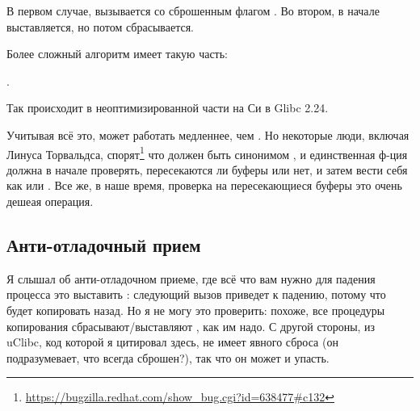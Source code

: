 В первом случае,  вызывается со сброшенным флагом .
Во втором,  в начале выставляется, но потом сбрасывается.

Более сложный алгоритм имеет такую часть:

.

Так происходит в неоптимизированной части на Си в Glibc 2.24.

Учитывая всё это,  может работать медленнее, чем .
Но некоторые люди, включая Линуса Торвальдса, спорят\footnote{\url{https://bugzilla.redhat.com/show_bug.cgi?id=638477\#c132}}
что  должен быть синонимом , и единственная ф-ция должна в начале проверять,
пересекаются ли буферы или нет, и затем вести себя как  или .
Все же, в наше время, проверка на пересекающиеся буферы это очень дешеая операция.

\subsection{Анти-отладочный прием}

Я слышал об анти-отладочном приеме, где всё что вам нужно для падения процесса это выставить : следующий вызов
 приведет к падению, потому что будет копировать назад.
Но я не могу это проверить: похоже, все процедуры копирования сбрасывают/выставляют , как им надо.
С другой стороны,  из uClibc, код которой я цитировал здесь,
не имеет явного сброса  (он подразумевает, что  всегда сброшен?),
так что он может и упасть.

